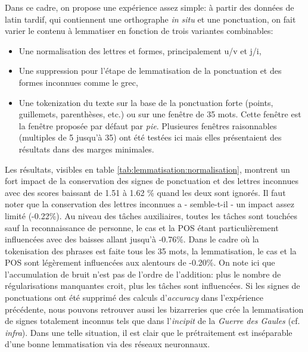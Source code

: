 Dans ce cadre, on propose une expérience assez simple: à partir des données de latin tardif, qui contiennent une orthographe \textit{in situ} et une ponctuation, on fait varier le contenu à lemmatiser en fonction de trois variantes combinables:
\begin{itemize}
    \item Une normalisation des lettres et formes, principalement u/v et j/i,
    \item Une suppression pour l'étape de lemmatisation de la ponctuation et des formes inconnues comme le grec,
    \item Une tokenization du texte sur la base de la ponctuation forte (points, guillemets, parenthèses, etc.) ou sur une fenêtre de 35 mots. Cette fenêtre est la fenêtre proposée par défaut par \textit{pie}. Plusieures fenêtres raisonnables (multiples de 5 jusqu'à 35) ont été testées ici mais elles présentaient des résultats dans des marges minimales.
\end{itemize}
Les résultats, visibles en table \ref{tab:lemmatisation:normalisation}, montrent un fort impact de la conservation des signes de ponctuation et des lettres inconnues avec des scores baissant de 1.51 à 1.62 \% quand les deux sont ignorés. Il faut noter que la conservation des lettres inconnues a - semble-t-il - un impact assez limité (-0.22\%). Au niveau des tâches auxiliaires, toutes les tâches sont touchées sauf la reconnaissance de personne, le cas et la POS étant particulièrement influencées avec des baisses allant jusqu'à -0.76\%. Dans le cadre où la tokenisation des phrases est faite tous les 35 mots, la lemmatisation, le cas et la POS sont légèrement influencées aux alentours de -0.20\%. On note ici que l'accumulation de bruit n'est pas de l'ordre de l'addition: plus le nombre de régularisations manquantes croit, plus les tâches sont influencées. Si les signes de ponctuations ont été supprimé des calculs d'\textit{accuracy} dans l'expérience précédente, nous pouvons retrouver aussi les bizarreries que crée la lemmatisation de signes totalement inconnus tels que dans l'\textit{incipit} de la \textit{Guerre des Gaules} (cf. \textit{infra}). Dans une telle situation, il est clair que le prétraitement est inséparable d'une bonne lemmatisation via des réseaux neuronnaux.

